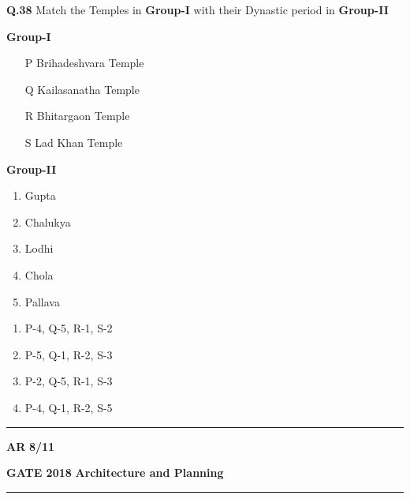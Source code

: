 \documentclass{article}
\begin{document}
\noindent\textbf{Q.38} Match the Temples in \textbf{Group-I} with their Dynastic period in \textbf{Group-II}
\begin{multicols}{2}
    

\textbf{Group-I}
\begin{enumerate}[label=\Alph*,leftmargin=1.5cm]
    \item [P] \hspace{0.2cm} Brihadeshvara Temple
    \item [Q] \hspace{0.2cm} Kailasanatha Temple
    \item [R] \hspace{0.2cm} Bhitargaon Temple
    \item [S] \hspace{0.2cm} Lad Khan Temple
\end{enumerate}
\columnbreak \noindent
\hspace{1cm} \textbf{Group-II}
\begin{enumerate}
    \item Gupta
    \item Chalukya
    \item Lodhi
    \item Chola
    \item Pallava
\end{enumerate}
\end{multicols}

\begin{multicols}{2}
\begin{enumerate}[label=(\Alph*),leftmargin = 1.5cm ]
    \item P-4, Q-5, R-1, S-2
    \item P-5, Q-1, R-2, S-3
    \item P-2, Q-5, R-1, S-3
    \item P-4, Q-1, R-2, S-5
\end{enumerate}
\end{multicols}

 \noindent
\hrule \vspace{0.0875CM} \textbf{AR} \hfill  \textbf{8/11}

\newpage

\noindent
\textbf{GATE 2018} \hfill \textbf{Architecture and Planning}
\vspace{0.0012cm} \hrule
\end{document}
